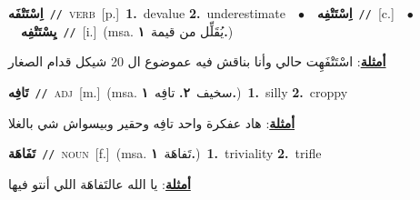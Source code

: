 \documentclass[10pt,a4paper,twoside]{article} %
\begin{document}
\begin{multicols}{2}
{\setlength\topsep{0pt}\textbf{\foreignlanguage{arabic}{اِسْتَتْفَه}}\ {\color{gray}\texttt{//}\color{black}}\ \textsc{verb}\ [p.]\ \textbf{1.}~devalue  \textbf{2.}~underestimate\ \ $\bullet$\ \ \setlength\topsep{0pt}\textbf{\foreignlanguage{arabic}{اِسْتَتْفِه}}\ {\color{gray}\texttt{//}\color{black}}\ [c.]\ \ $\bullet$\ \ \setlength\topsep{0pt}\textbf{\foreignlanguage{arabic}{يِسْتَتْفِه}}\ {\color{gray}\texttt{//}\color{black}}\ [i.]\ \color{gray}(msa. \foreignlanguage{arabic}{يُقَلِّل من قيمة}~\foreignlanguage{arabic}{\textbf{١.}})\color{black}\  \begin{flushright}\color{gray}\foreignlanguage{arabic}{\textbf{\underline{\foreignlanguage{arabic}{أمثلة}}}: اسْتَتْفَهِت حالي وأنا بناقش فيه عموضوع ال 20 شيكل قدام الصغار}\end{flushright}\color{black}} \vspace{2mm}

{\setlength\topsep{0pt}\textbf{\foreignlanguage{arabic}{تَافِه}}\ {\color{gray}\texttt{//}\color{black}}\ \textsc{adj}\ [m.]\ \color{gray}(msa. \foreignlanguage{arabic}{سخيف}~\foreignlanguage{arabic}{\textbf{٢.}}  \foreignlanguage{arabic}{تافِه}~\foreignlanguage{arabic}{\textbf{١.}})\color{black}\ \textbf{1.}~silly  \textbf{2.}~croppy\  \begin{flushright}\color{gray}\foreignlanguage{arabic}{\textbf{\underline{\foreignlanguage{arabic}{أمثلة}}}: هاد عفكرة واحد تافِه وحقير وبيسواش شي بالغلا}\end{flushright}\color{black}} \vspace{2mm}

{\setlength\topsep{0pt}\textbf{\foreignlanguage{arabic}{تَفَاهَة}}\ {\color{gray}\texttt{//}\color{black}}\ \textsc{noun}\ [f.]\ \color{gray}(msa. \foreignlanguage{arabic}{تَفاهَة}~\foreignlanguage{arabic}{\textbf{١.}})\color{black}\ \textbf{1.}~triviality  \textbf{2.}~trifle\  \begin{flushright}\color{gray}\foreignlanguage{arabic}{\textbf{\underline{\foreignlanguage{arabic}{أمثلة}}}: يا الله عالتَفاهَة اللي أنتو فيها}\end{flushright}\color{black}} \vspace{2mm}


\end{multicols}
\end{document}
